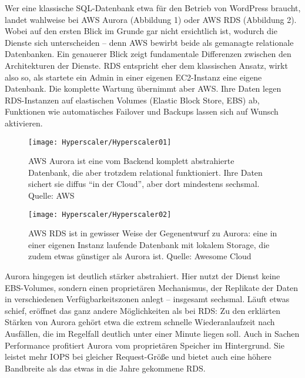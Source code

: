 Wer eine klassische SQL-Datenbank etwa für den Betrieb von WordPress braucht, landet wahlweise bei AWS Aurora (Abbildung 1) oder AWS RDS (Abbildung 2). Wobei auf den ersten Blick im Grunde gar nicht ersichtlich ist, wodurch die Dienste sich unterscheiden – denn AWS bewirbt beide als gemanagte relationale Datenbanken. Ein genauerer Blick zeigt fundamentale Differenzen zwischen den Architekturen der Dienste. RDS entspricht eher dem klassischen Ansatz, wirkt also so, als startete ein Admin in einer eigenen EC2-Instanz eine eigene Datenbank. Die komplette Wartung übernimmt aber AWS. Ihre Daten legen RDS-Instanzen auf elastischen Volumes (Elastic Block Store, EBS) ab, Funktionen wie automatisches Failover und Backups lassen sich auf Wunsch aktivieren.

\begin{figure}
	
	\begin{center}
		
		\texttt{[image: Hyperscaler/Hyperscaler01]}
		
		\caption[AWS Aurora]{AWS Aurora ist eine vom Backend komplett abstrahierte Datenbank, die aber trotzdem relational funktioniert. Ihre Daten sichert sie diffus ``in der Cloud'', aber dort mindestens sechsmal. Quelle: AWS}
	\end{center} 
\end{figure}	

\begin{figure}
	
	\begin{center}
		
		\texttt{[image: Hyperscaler/Hyperscaler02]}
		
		\caption[AWS RDS]{AWS RDS ist in gewisser Weise der Gegenentwurf zu Aurora: eine in einer eigenen Instanz laufende Datenbank mit lokalem Storage, die zudem etwas günstiger als Aurora ist. Quelle: Awesome Cloud}
	\end{center} 
\end{figure}	


Aurora hingegen ist deutlich stärker abstrahiert. Hier nutzt der Dienst keine EBS-Volumes, sondern einen proprietären Mechanismus, der Replikate der Daten in verschiedenen Verfügbarkeitszonen anlegt – insgesamt sechsmal. Läuft etwas schief, eröffnet das ganz andere Möglichkeiten als bei RDS: Zu den erklärten Stärken von Aurora gehört etwa die extrem schnelle Wiederanlaufzeit nach Ausfällen, die im Regelfall deutlich unter einer Minute liegen soll. Auch in Sachen Performance profitiert Aurora vom proprietären Speicher im Hintergrund. Sie leistet mehr IOPS bei gleicher Request-Größe und bietet auch eine höhere Bandbreite als das etwas in die Jahre gekommene RDS.

